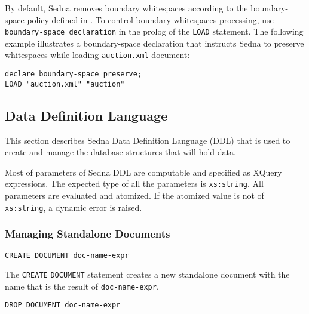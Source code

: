 \documentclass[a4paper,12pt]{article}
\begin{document}
By default, Sedna removes boundary whitespaces according to the boundary-space
policy defined in \cite{paper:query-language}. To control boundary whitespaces
processing, use \verb!boundary-space declaration! \cite{paper:query-language} in
the prolog of the \verb!LOAD! statement. The following example illustrates a
boundary-space declaration that instructs Sedna to preserve whitespaces while
loading \verb!auction.xml! document:

\begin{verbatim}
declare boundary-space preserve;
LOAD "auction.xml" "auction"
\end{verbatim}


\subsection{Data Definition Language}

This section describes Sedna Data Definition Language (DDL) that is used to
create and manage the database structures that will hold data.

Most of parameters of Sedna DDL are computable and specified as XQuery
expressions. The expected type of all the parameters is \verb!xs:string!. All
parameters are evaluated and atomized. If the atomized value is not of
\verb!xs:string!, a dynamic error is raised.


\subsubsection{Managing Standalone Documents}
\begin{verbatim}
CREATE DOCUMENT doc-name-expr
\end{verbatim}

The \verb!CREATE! \verb!DOCUMENT! statement creates a new standalone document
with the name that is the result of \verb!doc-name-expr!.

\begin{verbatim}
DROP DOCUMENT doc-name-expr
\end{verbatim}
\end{document}
